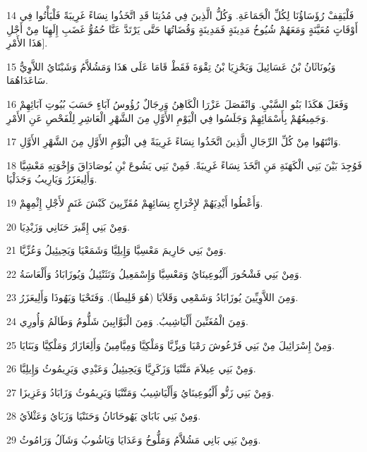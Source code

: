 \par 14 فَلْيَقِفْ رُؤَسَاؤُنَا لِكُلِّ الْجَمَاعَةِ. وَكُلُّ الَّذِينَ فِي مُدُنِنَا قَدِ اتَّخَذُوا نِسَاءً غَرِيبَةً فَلْيَأْتُوا فِي أَوْقَاتٍ مُعَيَّنَةٍ وَمَعَهُمْ شُيُوخُ مَدِينَةٍ فَمَدِينَةٍ وَقُضَاتُهَا حَتَّى يَرْتَدَّ عَنَّا حُمُوُّ غَضَبِ إِلَهِنَا مِنْ أَجْلِ هَذَا الأَمْرِ].
\par 15 وَيُونَاثَانُ بْنُ عَسَائِيلَ وَيَحْزِيَا بْنُ تِقْوَةَ فَقَطْ قَامَا عَلَى هَذَا وَمَشُلاَّمُ وَشَبْتَايُ اللاَّوِيُّ سَاعَدَاهُمَا.
\par 16 وَفَعَلَ هَكَذَا بَنُو السَّبْيِ. وَانْفَصَلَ عَزْرَا الْكَاهِنُ وَرِجَالٌ رُؤُوسُ آبَاءٍ حَسَبَ بُيُوتِ آبَائِهِمْ وَجَمِيعُهُمْ بِأَسْمَائِهِمْ وَجَلَسُوا فِي الْيَوْمِ الأَوَّلِ مِنَ الشَّهْرِ الْعَاشِرِ لِلْفَحْصِ عَنِ الأَمْرِ.
\par 17 وَانْتَهُوا مِنْ كُلِّ الرِّجَالِ الَّذِينَ اتَّخَذُوا نِسَاءً غَرِيبَةً فِي الْيَوْمِ الأَوَّلِ مِنَ الشَّهْرِ الأَوَّلِ.
\par 18 فَوُجِدَ بَيْنَ بَنِي الْكَهَنَةِ مَنِ اتَّخَذَ نِسَاءً غَرِيبَةً. فَمِنْ بَنِي يَشُوعَ بْنِ يُوصَادَاقَ وَإِخْوَتِهِ مَعْشِيَّا وَأَلِيعَزَرُ وَيَارِيبُ وَجَدَلْيَا.
\par 19 وَأَعْطُوا أَيْدِيَهُمْ لإِخْرَاجِ نِسَائِهِمْ مُقَرِّبِينَ كَبْشَ غَنَمٍ لأَجْلِ إِثْمِهِمْ.
\par 20 وَمِنْ بَنِي إِمِّيرَ حَنَانِي وَزَبْدِيَا.
\par 21 وَمِنْ بَنِي حَارِيمَ مَعْسِيَّا وَإِيلِيَّا وَشَمَعْيَا وَيَحِيئِيلُ وَعُزِّيَّا.
\par 22 وَمِنْ بَنِي فَشْحُورَ أَلْيُوعِينَايُ وَمَعْسِيَّا وَإِسْمَعِيلُ وَنَثَنْئِيلُ وَيُوزَابَادُ وَأَلْعَاسَةُ.
\par 23 وَمِنَ اللاَّوِيِّينَ يُوزَابَادُ وَشَمْعِي وَقَلاَيَا (هُوَ قَلِيطَا). وَفَتَحْيَا وَيَهُوذَا وَأَلِيعَزَرُ.
\par 24 وَمِنَ الْمُغَنِّينَ أَلْيَاشِيبُ. وَمِنَ الْبَوَّابِينَ شَلُّومُ وَطَالَمُ وَأُورِي.
\par 25 وَمِنْ إِسْرَائِيلَ مِنْ بَنِي فَرْعُوشَ رَمْيَا وَيِزِّيَّا وَمَلْكِيَّا وَمِيَّامِينُ وَأَلِعَازَارُ وَمَلْكِيَّا وَبَنَايَا.
\par 26 وَمِنْ بَنِي عِيلاَمَ مَتَّنْيَا وَزَكَرِيَّا وَيَحِيئِيلُ وَعَبْدِي وَيَرِيمُوثُ وَإِيلِيَّا.
\par 27 وَمِنْ بَنِي زَتُّو أَلْيُوعِينَايُ وَأَلْيَاشِيبُ وَمَتَّنْيَا وَيَرِيمُوثُ وَزَابَادُ وَعَزِيزَا.
\par 28 وَمِنْ بَنِي بَابَايَ يَهُوحَانَانُ وَحَنَنْيَا وَزَبَايُ وَعَثْلاَيُ.
\par 29 وَمِنْ بَنِي بَانِي مَشُلاَّمُ وَمَلُّوخُ وَعَدَايَا وَيَاشُوبُ وَشَآلُ وَرَامُوثُ.
